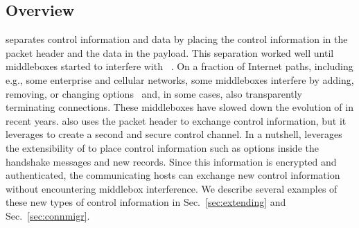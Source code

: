 \subsection{Overview}

\tcp separates control information and data by placing the control information in the packet header and the data in the payload. This separation worked well until middleboxes started to interfere with \tcp~\cite{10.1145/1064413.1064418,
honda2011still, DHBVD13}.  On a fraction of Internet paths, including e.g.,
some enterprise and cellular networks, some middleboxes interfere by adding,
removing, or changing \tcp options~\cite{wang2011untold, honda2011still, xu2015investigating} and, in some cases, also transparently terminating \tcp connections. These middleboxes have slowed down the evolution of \tcp in recent years. \tcpls also uses the packet header to exchange \tcp control information, but it leverages \tls to create a second and secure control channel. In a nutshell, \tcpls leverages the extensibility of  to place control information such as \tcp options inside the \tls handshake messages and new \tls records. Since this information is encrypted and authenticated, the communicating hosts can exchange new control information without encountering middlebox interference. We describe several examples of these new
types of control information in Sec.~\ref{sec:extending} and
Sec.~\ref{sec:connmigr}.






